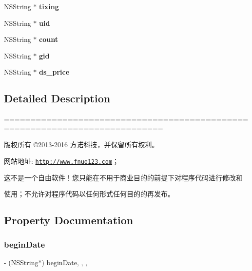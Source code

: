 \begin{DoxyCompactItemize}
N\+S\+String $\ast$ {\bfseries tixing}
\item 
\mbox{\label{interface_f_n_h_sec_kill_proudct_model_a99072db7460302874bf77463d1cf2895}} 
N\+S\+String $\ast$ {\bfseries uid}
\item 
\mbox{\label{interface_f_n_h_sec_kill_proudct_model_abcef97ad20f74cdf3373ab431635e2b8}} 
N\+S\+String $\ast$ {\bfseries count}
\item 
\mbox{\label{interface_f_n_h_sec_kill_proudct_model_adbbbd8c3ed4a1d74c36a258259d3db29}} 
N\+S\+String $\ast$ {\bfseries gid}
\item 
\mbox{\label{interface_f_n_h_sec_kill_proudct_model_a105c6a934b8db10c731d08a5fa3c7c5b}} 
N\+S\+String $\ast$ {\bfseries ds\+\_\+price}
\end{DoxyCompactItemize}


\subsection{Detailed Description}
============================================================================

版权所有 ©2013-\/2016 方诺科技，并保留所有权利。

网站地址\+: \href{http://www.fnuo123.com}{\tt http\+://www.\+fnuo123.\+com}； 



这不是一个自由软件！您只能在不用于商业目的的前提下对程序代码进行修改和

使用；不允许对程序代码以任何形式任何目的的再发布。 

 

\subsection{Property Documentation}
\mbox{\label{interface_f_n_h_sec_kill_proudct_model_a9f5c0effd9f384a288c75c2f509ae82c}} 
\subsubsection{\texorpdfstring{begin\+Date}{beginDate}}
{\footnotesize\ttfamily -\/ (N\+S\+String$\ast$) begin\+Date\hspace{0.3cm}{\ttfamily [read]}, {\ttfamily [write]}, {\ttfamily [nonatomic]}, {\ttfamily [copy]}}

